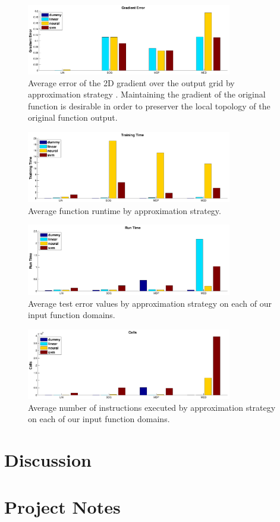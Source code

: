 \documentclass{article}
\begin{document}
\begin{figure}
  \centering
  \includegraphics[width=0.8\textwidth]{images/results_grad_rmse}
  \caption{Average error of the 2D gradient over the output grid by approximation strategy . Maintaining the gradient of the original function is desirable in order to preserver the local topology of the original function output.}
\end{figure}

\begin{figure}
  \centering
  \includegraphics[width=0.8\textwidth]{images/results_run_time}
  \caption{Average function runtime by approximation strategy.}
\end{figure}

\begin{figure}
  \centering
  \includegraphics[width=0.8\textwidth]{images/results_train_time}
  \caption{Average test error values by approximation strategy on each of our input function domains.}
\end{figure}

\begin{figure}
  \centering
  \includegraphics[width=0.8\textwidth]{images/results_instructions}
  \caption{Average number of instructions executed by approximation strategy on each of our input function domains.}
\end{figure}

\section{Discussion}

\section{Project Notes}



\end{document}
